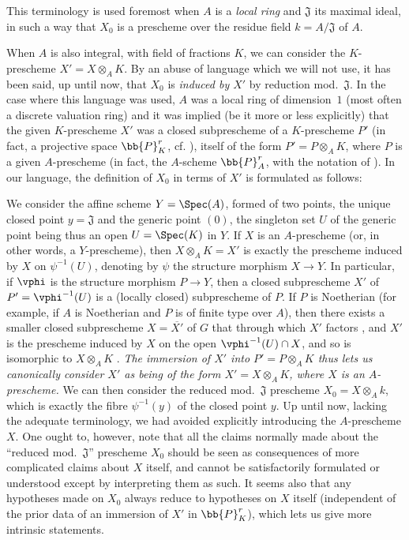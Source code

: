 \begin{env}
\label{I.3.7.2}
This terminology is used foremost when $A$ is a \emph{local ring} and $\mathfrak{J}$ its maximal ideal, in such a way that $X_0$ is a prescheme over the residue field $k=A/\mathfrak{J}$ of $A$.

When $A$ is also integral, with field of fractions $K$, we can consider the $K$-prescheme $X'=X\otimes_A K$.
By an abuse of language which we will not use, it has been said, up until now, that $X_0$ is \emph{induced by $X'$} by reduction mod.~$\mathfrak{J}$.
In the case where this language was used, $A$ was a local ring of dimension~$1$ (most often a discrete valuation ring) and it was implied (be it more or less explicitly) that the given $K$-prescheme $X'$ was a closed subprescheme of a $K$-prescheme $P'$ (in fact, a projective space  $\bb{P}_K^r$, cf. ), itself of the form $P'=P\otimes_A K$, where $P$ is a given $A$-prescheme (in fact, the $A$-scheme $\bb{P}_A^r$, with the notation of ).
In our language, the definition of $X_0$ in terms of $X'$ is formulated as follows:

We consider the affine scheme $Y=\Spec(A)$, formed of two points, the unique closed point
$y=\mathfrak{J}$ and the generic point $(0)$, the singleton set $U$ of the generic point being thus an open $U=\Spec(K)$ in $Y$.
If $X$ is an $A$-prescheme (or, in other words, a $Y$-prescheme), then $X\otimes_A K=X'$ is exactly the prescheme induced by $X$ on $\psi^{-1}(U)$, denoting by $\psi$ the structure morphism $X\to Y$.
In particular, if $\vphi$ is the structure morphism $P\to Y$, then a closed subprescheme $X'$ of $P'=\vphi^{-1}(U)$ is a (locally closed) subprescheme of $P$.
If $P$ is Noetherian (for example, if $A$ is Noetherian and $P$ is of finite type over $A$), then there exists a smaller closed subprescheme $X=\overline{X'}$ of $G$ that through which $X'$ factors , and $X'$ is the prescheme induced by $X$ on the open $\vphi^{-1}(U)\cap X$, and so is isomorphic to $X\otimes_A K$ .
\emph{The immersion of $X'$ into $P'=P\otimes_A K$ thus lets us canonically consider $X'$ as being of the form $X'=X\otimes_A K$, where $X$ is an $A$-prescheme.}
We can then consider the reduced mod.~$\mathfrak{J}$ prescheme $X_0=X\otimes_A k$, which is exactly the fibre $\psi^{-1}(y)$ of the closed point $y$.
Up until now, lacking the adequate terminology, we had avoided explicitly introducing the $A$-prescheme $X$.
One ought to, however, note that all the claims normally made about the ``reduced mod.~$\mathfrak{J}$'' prescheme  $X_0$ should be seen as consequences of more complicated claims about $X$ itself, and cannot be satisfactorily formulated or understood except by interpreting them as such.
It seems also that any hypotheses made on $X_0$ always reduce to hypotheses on $X$ itself (independent of the prior data of an immersion of $X'$ in $\bb{P}_K^r$), which lets us give more intrinsic statements.
\end{env}

